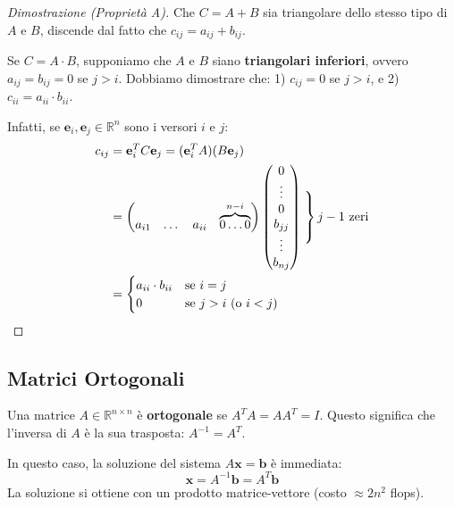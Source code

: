 \begin{proof}[Dimostrazione (Proprietà A)]
    Che $C=A+B$ sia triangolare dello stesso tipo di $A$ e $B$, discende dal fatto che $c_{ij} = a_{ij} + b_{ij}$.
    
    Se $C=A \cdot B$, supponiamo che $A$ e $B$ siano \textbf{triangolari inferiori}, ovvero $a_{ij}=b_{ij}=0$ se $j>i$. Dobbiamo dimostrare che: 1) $c_{ij}=0$ se $j>i$, e 2) $c_{ii} = a_{ii} \cdot b_{ii}$.
    
    Infatti, se $\mathbf{e}_i, \mathbf{e}_j \in \mathbb{R}^n$ sono i versori $i$ e $j$:
    \begin{align*}
        c_{ij} &= \mathbf{e}_i^T C \mathbf{e}_j = (\mathbf{e}_i^T A) (B \mathbf{e}_j) \\
             &= 
        \begin{pmatrix}
            a_{i1} & \dots & a_{ii} & \overbrace{0 \dots 0}^{n-i}
        \end{pmatrix}
        \begin{pmatrix}
            0 \\ \vdots \\ 0 \\ b_{jj} \\ \vdots \\ b_{nj}
        \end{pmatrix}
        \left. \vphantom{\begin{matrix} 0 \\ \vdots \\ 0 \end{matrix}} \right\} j-1 \text{ zeri}
        \\
        &=
        \begin{cases} 
            a_{ii} \cdot b_{ii} & \text{se } i=j \\
            0 & \text{se } j>i \text{ (o } i<j \text{)}
        \end{cases}
    \end{align*}
    
    \end{proof}

\subsection{Matrici Ortogonali}
\begin{definition}
Una matrice $A \in \mathbb{R}^{n \times n}$ è \textbf{ortogonale} se $A^T A = A A^T = I$.
Questo significa che l'inversa di $A$ è la sua trasposta: $A^{-1} = A^T$.
\end{definition}
In questo caso, la soluzione del sistema $A\mathbf{x} = \mathbf{b}$ è immediata:
$$ \mathbf{x} = A^{-1}\mathbf{b} = A^T \mathbf{b} $$
La soluzione si ottiene con un prodotto matrice-vettore (costo $\approx 2n^2$ flops).

